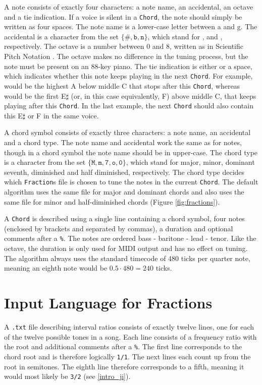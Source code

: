 \documentclass[a4paper]{article}
\begin{document}
\begin{appendices}
A note consists of exactly four characters: a note name, an accidental, an octave and a tie indication. If a voice is silent in a \texttt{Chord}, the note should simply be written as four spaces. The note name is a lower-case letter between a and g. The accidental is a character from the set $\{\texttt{\#}, \texttt{b}, \texttt{n}\}$, which stand for ,  and , respectively. The octave is a number between 0 and 8, written as in Scientific Pitch Notation \cite{pollens_pitch_2022}. The octave makes no difference in the tuning process, but the note must be present on an 88-key piano. The tie indication is either  or a space, which indicates whether this note keeps playing in the next \texttt{Chord}. For example,  would be the highest A below middle C that stops after this \texttt{Chord}, whereas  would be the first E$\sharp$ (or, in this case equivalently, F) above middle C, that keeps playing after this \texttt{Chord}. In the last example, the next \texttt{Chord} should also contain this E$\sharp$ or F in the same voice.

A chord symbol consists of exactly three characters: a note name, an accidental and a chord type. The note name and accidental work the same as for notes, though in a chord symbol the note name should be in upper-case. The chord type is a character from the set $\{\texttt{M}, \texttt{m}, \texttt{7}, \texttt{o}, \texttt{0}\}$, which stand for major, minor, dominant seventh, diminished and half diminished, respectively. The chord type decides which \texttt{Fraction}s file is chosen to tune the notes in the current \texttt{Chord}. The default algorithm uses the same file for major and dominant chords and also uses the same file for minor and half-diminished chords (Figure \ref{fig:fractions}).

A \texttt{Chord} is described using a single line containing a chord symbol, four notes (enclosed by brackets and separated by commas), a duration and optional comments after a \texttt{\%}. The notes are ordered bass - baritone - lead - tenor. Like the octave, the duration is only used for MIDI output and has no effect on tuning. The algorithm always uses the standard \cite{dobrian_timing_2014} timecode of 480 ticks per quarter note, meaning an eighth note would be $0.5 \cdot 480 = 240$ ticks.

\section{Input Language for Fractions}
\label{input_fractions}
A \texttt{.txt} file describing interval ratios consists of exactly twelve lines, one for each of the twelve possible tones in a song. Each line consists of a frequency ratio with the root and additional comments after a \texttt{\%}. The first line corresponds to the chord root and is therefore logically \texttt{1/1}. The next lines each count up from the root in semitones. The eighth line therefore corresponds to a fifth, meaning it would most likely be \texttt{3/2} (see \ref{intro_ji}).


\end{appendices}
\end{document}
